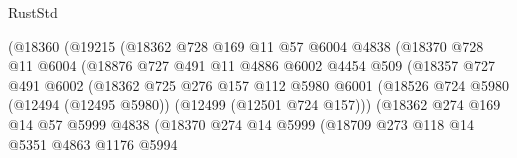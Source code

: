 \begin{lexlean}{RustStd}
\begin{coremodule}
{\begin{coremodule}
{{{{{{{{{{{{{{{{{{{{{{{{{{{{{{{{{{{{{{{{{{{{{{{{{{{{{{{{{{{{{{{{{{{{{{{{{{{{{{{{                            (@18360
                              (@19215
                                (@18362
                                  @728
                                  @169
                                  @11
                                  @57
                                  @6004
                                  @4838
                                  (@18370
                                    @728
                                    @11
                                    @6004
                                    (@18876
                                      @727
                                      @491
                                      @11
                                      @4886
                                      @6002
                                      @4454
                                      @509
                                      (@18357
                                        @727
                                        @491
                                        @6002
                                        (@18362
                                          @725
                                          @276
                                          @157
                                          @112
                                          @5980
                                          @6001
                                          (@18526
                                            @724
                                            @5980
                                            (@12494 (@12495 @5980))
                                            (@12499 (@12501 @724 @157)))
                                          (@18362
                                            @274
                                            @169
                                            @14
                                            @57
                                            @5999
                                            @4838
                                            (@18370
                                              @274
                                              @14
                                              @5999
                                              (@18709
                                                @273
                                                @118
                                                @14
                                                @5351
                                                @4863
                                                @1176
                                                @5994
}}}}}}}}}}}}}}}}}}}}}}}}}}}}}}}}}}}}}}}}}}}}}}}}}}}}}}}}}}}}}}}}}}}}}}}}}}}}}}}}
\end{coremodule}}
\end{coremodule}
\end{lexlean}
